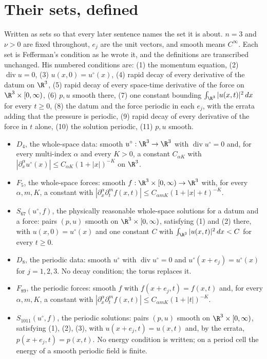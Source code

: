 \section{Their sets, defined}

Written as sets so that every later sentence names the set it is about. $n = 3$ and $\nu > 0$ are
fixed throughout, $e_j$ are the unit vectors, and smooth means $C^\infty$. Each set is Fefferman's
condition as he wrote it, and the definitions are transcribed unchanged. His numbered conditions
are: (1) the momentum equation, (2) $\operatorname{div} u = 0$, (3) $u(x,0) = u^\circ(x)$, (4)
rapid decay of every derivative of the datum on $\R^3$, (5) rapid decay of every space-time
derivative of the force on $\R^3\times[0,\infty)$, (6) $p, u$ smooth there, (7) one constant
bounding $\int_{\R^3}|u(x,t)|^2\,dx$ for every $t\ge 0$, (8) the datum and the force periodic in each
$e_j$, with the errata adding that the pressure is periodic, (9) rapid decay of every derivative of
the force in $t$ alone, (10) the solution periodic, (11) $p, u$ smooth.

\begin{itemize}
\item $D_4$, the whole-space data: smooth $u^\circ:\R^3\to\R^3$ with $\operatorname{div}u^\circ = 0$
  and, for every multi-index $\alpha$ and every $K>0$, a constant $C_{\alpha K}$ with
  $|\partial_x^\alpha u^\circ(x)| \le C_{\alpha K}(1+|x|)^{-K}$ on $\R^3$.
\item $F_5$, the whole-space forces: smooth $f:\R^3\times[0,\infty)\to\R^3$ with, for every
  $\alpha, m, K$, a constant with $|\partial_x^\alpha\partial_t^m f(x,t)| \le C_{\alpha m K}(1+|x|+t)^{-K}$.
\item $S_{67}(u^\circ,f)$, the physically reasonable whole-space solutions for a datum and a force:
  pairs $(p,u)$ smooth on $\R^3\times[0,\infty)$, satisfying (1) and (2) there, with $u(x,0)=u^\circ(x)$
  and one constant $C$ with $\int_{\R^3}|u(x,t)|^2\,dx < C$ for every $t \ge 0$.
\item $D_8$, the periodic data: smooth $u^\circ$ with $\operatorname{div}u^\circ=0$ and
  $u^\circ(x+e_j) = u^\circ(x)$ for $j = 1,2,3$. No decay condition; the torus replaces it.
\item $F_{89}$, the periodic forces: smooth $f$ with $f(x+e_j,t) = f(x,t)$ and, for every
  $\alpha, m, K$, a constant with $|\partial_x^\alpha\partial_t^m f(x,t)| \le C_{\alpha m K}(1+|t|)^{-K}$.
\item $S_{1011}(u^\circ,f)$, the periodic solutions: pairs $(p,u)$ smooth on $\R^3\times[0,\infty)$,
  satisfying (1), (2), (3), with $u(x+e_j,t) = u(x,t)$ and, by the errata, $p(x+e_j,t) = p(x,t)$. No
  energy condition is written; on a period cell the energy of a smooth periodic field is finite.
\end{itemize}

